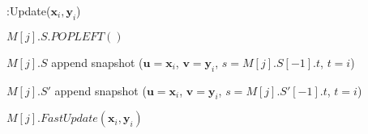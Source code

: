 \begin{algorithm}[t]
    \caption{\newsolution:Update($\boldsymbol{x}_i,\boldsymbol{y}_i$)}
    \label{alg:update-ml}
    \DontPrintSemicolon

    {
        {
            $M[j].S.POPLEFT()$
        }
        {
            $M[j].S$ append snapshot ($\boldsymbol{u}=\boldsymbol{x}_i$, $\boldsymbol{v}=\boldsymbol{y}_i$, $s=M[j].S[-1].t$, $t = i$)
            
            $M[j].S'$  append snapshot ($\boldsymbol{u} = \boldsymbol{x}_i$, $\boldsymbol{v} = \boldsymbol{y}_i$, $s=M[j].S'[-1].t$, $t = i$)
        }
        \Else
        {
            $M[j].\textit{FastUpdate}(\boldsymbol{x}_i,\boldsymbol{y}_i)$
        }
    }
    
\end{algorithm}
    
        